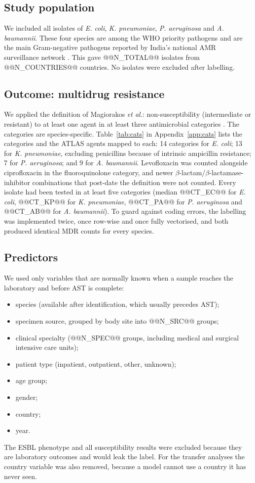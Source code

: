 \documentclass[11pt,a4paper]{article}
\newcommand{\sci}[1]{\textit{#1}}
\begin{document}
\subsection{Study population}
We included all isolates of \sci{E. coli}, \sci{K. pneumoniae}, \sci{P. aeruginosa} and \sci{A. baumannii}. These four species are among the WHO priority pathogens \cite{who_bppl2024} and are the main Gram-negative pathogens reported by India's national AMR surveillance network \cite{icmr2024}. This gave @@N_TOTAL@@ isolates from @@N_COUNTRIES@@ countries. No isolates were excluded after labelling.

\subsection{Outcome: multidrug resistance}
We applied the definition of Magiorakos \textit{et al.}: non-susceptibility (intermediate or resistant) to at least one agent in at least three antimicrobial categories \cite{magiorakos2012}. The categories are species-specific. Table~\ref{tab:cats} in Appendix~\ref{app:cats} lists the categories and the ATLAS agents mapped to each: 14 categories for \sci{E. coli}; 13 for \sci{K. pneumoniae}, excluding penicillins because of intrinsic ampicillin resistance; 7 for \sci{P. aeruginosa}; and 9 for \sci{A. baumannii}. Levofloxacin was counted alongside ciprofloxacin in the fluoroquinolone category, and newer $\beta$-lactam/$\beta$-lactamase-inhibitor combinations that post-date the definition were not counted. Every isolate had been tested in at least five categories (median @@CT_EC@@ for \sci{E. coli}, @@CT_KP@@ for \sci{K. pneumoniae}, @@CT_PA@@ for \sci{P. aeruginosa} and @@CT_AB@@ for \sci{A. baumannii}). To guard against coding errors, the labelling was implemented twice, once row-wise and once fully vectorised, and both produced identical MDR counts for every species.

\subsection{Predictors}
We used only variables that are normally known when a sample reaches the laboratory and before AST is complete:
\begin{itemize}
\item species (available after identification, which usually precedes AST);
\item specimen source, grouped by body site into @@N_SRC@@ groups;
\item clinical specialty (@@N_SPEC@@ groups, including medical and surgical intensive care units);
\item patient type (inpatient, outpatient, other, unknown);
\item age group;
\item gender;
\item country;
\item year.
\end{itemize}
The ESBL phenotype and all susceptibility results were excluded because they are laboratory outcomes and would leak the label. For the transfer analyses the country variable was also removed, because a model cannot use a country it has never seen.
\end{document}
